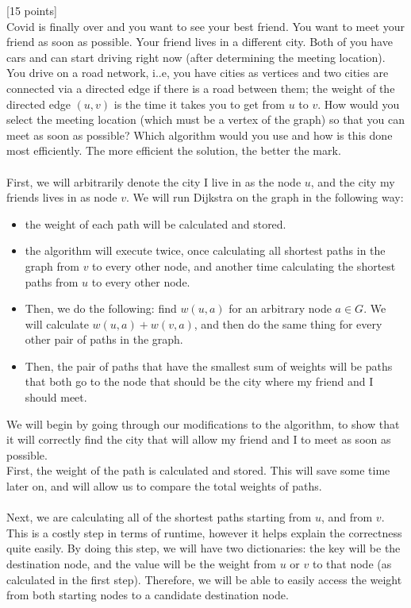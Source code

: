 \documentclass[12pt]{article}
\newcounter{ques}
\newenvironment{question}{\stepcounter{ques}{\noindent\bf Question \arabic{ques}:}}{\vspace{5mm}}
\begin{document}
\begin{question}[15 points]\\
Covid is finally over and    you want to see your best friend. You want to meet your friend as soon as possible. Your friend lives in a different city. Both of you have cars and can start driving right now (after determining the meeting location). You drive on a road network, i..e, you have cities as vertices and two cities are connected via a directed edge if there is a road between them; the weight of the directed edge $(u,v)$ is the time it takes you to get from $u$ to $v$. How would you select the meeting  location (which must be a vertex of the graph) so that you can meet as soon as possible? Which algorithm would you use and how is this done most efficiently. The more efficient the solution, the better the mark.\\\\
First, we will arbitrarily denote the city I live in as the node $u$, and the city my friends lives in as node $v$. We will run Dijkstra on the graph in the following way:
\begin{itemize}
  \item the weight of each path will be calculated and stored.
  \item the algorithm will execute twice, once calculating all shortest paths in the graph from $v$ to every other node, and another time calculating the shortest paths from $u$ to every other node.
  \item Then, we do the following: find $w(u,a)$ for an arbitrary node $a\in G$. We will calculate $w(u,a)+w(v,a)$, and then do the same thing for every other pair of paths in the graph.
  \item Then, the pair of paths that have the smallest sum of weights will be paths that both go to the node that should be the city where my friend and I should meet.
\end{itemize}
We will begin by going through our modifications to the algorithm, to show that it will correctly find the city that will allow my friend and I to meet as soon as possible.\\
First, the weight of the path is calculated and stored. This will save some time later on, and will allow us to compare the total weights of paths.\\\\
Next, we are calculating all of the shortest paths starting from $u$, and from $v$. This is a costly step in terms of runtime, however it helps explain the correctness quite easily. By doing this step, we will have two dictionaries: the key will be the destination node, and the value will be the weight from $u$ or $v$ to that node (as calculated in the first step). Therefore, we will be able to easily access the weight from both starting nodes to a candidate destination node.\\\\

\end{question}
\end{document}

